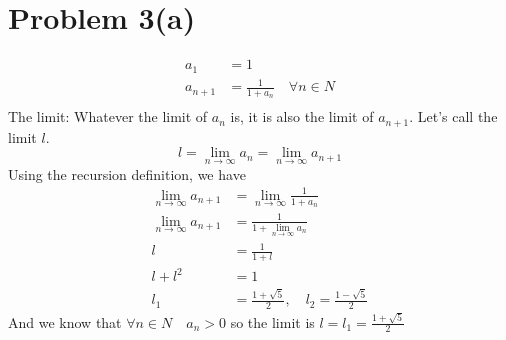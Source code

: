 \documentclass{article}
\begin{document}
\section*{Problem 3(a)}
\begin{align*}
   a_1 &= 1 \\
   a_{n+1} &= \frac{1}{1 + a_n} \quad \forall n \in N \\
\end{align*}
The limit:
Whatever the limit of \(a_n\) is, it is also the limit of \(a_{n+1}\). Let's call the limit \(l\).
\[
   l = \lim_{n \rightarrow \infty} a_n = \lim_{n \rightarrow \infty} a_{n+1}
\]
Using the recursion definition, we have
\begin{align*}
   \lim_{n \rightarrow \infty} a_{n+1} &= \lim_{n \rightarrow \infty} \frac{1}{1 + a_n} \\
   \lim_{n \rightarrow \infty} a_{n+1} &= \frac{1}{1 + \lim_{n \rightarrow \infty} a_n} \\
   l &= \frac{1}{1 + l} \\
   l + l^2 &= 1 \\
   l_1 &= \frac{1+\sqrt{5}}{2}, \quad l_2 = \frac{1-\sqrt{5}}{2}
\end{align*}
And we know that \(\forall n \in N \quad a_n > 0\) so the limit is \(l = l_1 = \frac{1+\sqrt{5}}{2}\)
\end{document}
